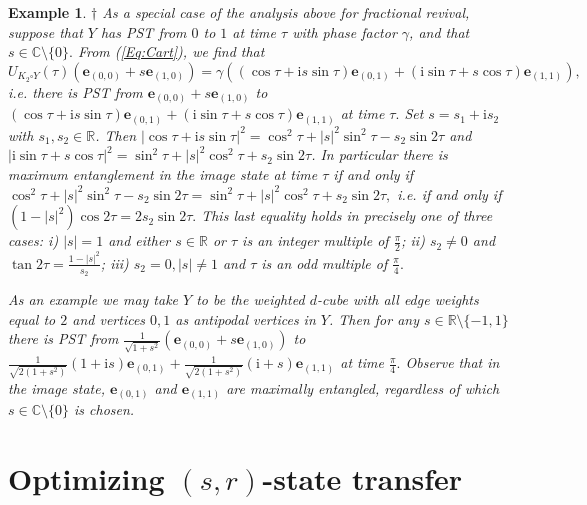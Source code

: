 \documentclass{article}
\numberwithin{equation}{section}
\newtheorem{ex}[lemma]{Example}
\newcommand{\be}{\mathbf e}
\def\C{\mathbb{C}}
\def\R{\mathbb{R}}
\def\ii{\mathrm{i}}
\begin{document}
{%

\begin{ex} {\rm{
$\dagger$ 
As a special case of the analysis above for fractional revival, suppose that $Y$ has PST from $0$ to $1$ at time $\tau$ with phase factor $\gamma$, and that $s\in \C\setminus\{0\}.$ From (\ref{Eq:Cart}), we find that $$U_{K_2\square Y}(\tau)(\be_{(0,0)}+s\be_{(1,0)}) = \gamma(  (\cos \tau + \ii s\sin \tau)\be_{(0,1)}+(\ii\sin \tau + s\cos \tau)\be_{(1,1)}),
$$ i.e. there is PST from $\be_{(0,0)}+s\be_{(1,0)}$ to $(\cos \tau + \ii s\sin \tau)\be_{(0,1)}+(\ii \sin \tau + s\cos \tau)\be_{(1,1)}$ at time $\tau.$ Set $s=s_1+ \ii s_2$ with $s_1, s_2 \in \R$. Then $|\cos \tau + \ii s\sin \tau|^2=\cos^2\tau + |s|^2 \sin^2 \tau -s_2 \sin 2\tau$ and 
$|\ii\sin \tau + s\cos \tau|^2=\sin^2 \tau +|s|^2\cos^2 \tau+s_2\sin 2\tau$. 
In particular there is maximum entanglement in the image state at time $\tau$ if and only if $\cos^2\tau + |s|^2 \sin^2 \tau -s_2 \sin 2\tau = \sin^2 \tau +|s|^2\cos^2 \tau+s_2\sin 2\tau,$ i.e. if and only if $ (1-|s|^2)\cos 2\tau =2s_2 \sin 2\tau.$ This last equality holds in precisely one of three cases: i) $|s|=1$ and either $s\in \R$ or $\tau$ is an integer multiple of $\frac{\pi}{2}$; ii) $s_2\ne 0$ and $\tan 2\tau = \frac{1-|s|^2}{s_2}$; iii) $s_2=0, |s|\ne 1$ and $\tau$ is an odd multiple of $\frac{\pi}{4}.$ }}

{\rm{
As an example we may take $Y$ to be the weighted $d$-cube with all edge weights equal to $2$ and vertices $0, 1$ as antipodal vertices in $Y$. Then for any $s\in \R\setminus \{-1,1\}$ there is PST from 
$\frac{1}{\sqrt{1+s^2}}(\be_{(0,0)}+s\be_{(1,0)})$ to 
$ \frac{1}{\sqrt{2(1+s^2)}}(1+ \ii s) \be_{(0,1)}+  \frac{1}{\sqrt{2(1+s^2)}}(\ii+s) \be_{(1,1)} $ at time $\frac{\pi}{4}.$ Observe that in the image state,  $ \be_{(0,1)}$ and $ \be_{(1,1)}$ are maximally entangled, regardless of which $s \in \C\setminus\{0\}$ is chosen.}}
\end{ex}



\section{Optimizing $(s,r)$-state transfer}\label{sec:optim}

}
\end{document}
